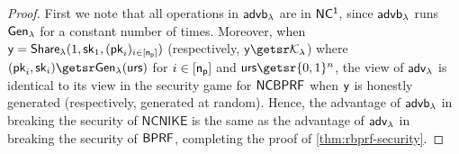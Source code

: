 \begin{proof}
	First we note that all operations in $\mathsf{advb}_{\lambda}$ are in $\mathsf{NC^1}$, since $\mathsf{advb}_{\lambda}$ runs ${\mathsf{Gen}}_\lambda$ for a constant number of times.
	Moreover, when $\mathsf{y} = {\mathsf{Share}}_\lambda(1, \mathsf{sk}_{1}, (\mathsf{pk}_i)_{i \in [\mathsf{n_p}]})$ (respectively, $\image\getsr \nikeshkspace$)  where $(\pk_i, \sk_i) \getsr \gen(\urs)$ for $i \in [\mathsf{n_p}]$ and $\urs \getsr \bin^{n}$, the view of ${\mathsf{adv}}_\lambda$ is identical to its view in the security game for $\mathsf{NCBPRF}$ when $\mathsf{y}$ is honestly generated (respectively, generated at random). Hence, the advantage of $\mathsf{advb}_{\lambda}$ in breaking the security of $\mathsf{NCNIKE}$ is the same as the advantage of ${\mathsf{adv}}_\lambda$ in breaking the security of $\mathsf{BPRF}$,
	completing the proof of \cref{thm:rbprf-security}.

\end{proof}
